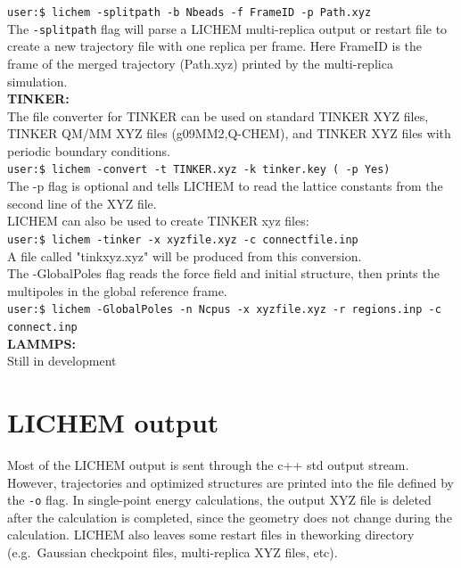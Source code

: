 \documentclass[12pt]{report}
\begin{document}
\texttt{user:\$ lichem -splitpath -b Nbeads -f FrameID -p Path.xyz} \\

The \texttt{-splitpath} flag will parse a LICHEM multi-replica output or
restart file to create a new trajectory file with one replica per frame.
Here FrameID is the frame of the merged trajectory (Path.xyz) printed by the
multi-replica simulation. \\

{\textbf{TINKER:}} \\

The file converter for TINKER can be used on standard TINKER XYZ files,
TINKER QM/MM XYZ files (g09MM2,Q-CHEM), and TINKER XYZ files with periodic
boundary conditions. \\

\texttt{user:\$ lichem -convert -t TINKER.xyz -k tinker.key ( -p Yes)} \\

The -p flag is optional and tells LICHEM to read the lattice constants from
the second line of the XYZ file. \\

LICHEM can also be used to create TINKER xyz files: \\

\texttt{user:\$ lichem -tinker -x xyzfile.xyz -c connectfile.inp} \\

A file called "tinkxyz.xyz" will be produced from this conversion. \\

The -GlobalPoles flag reads the force field and initial structure, then prints
the multipoles in the global reference frame. \\

\texttt{user:\$ lichem -GlobalPoles -n Ncpus
-x xyzfile.xyz -r regions.inp
 -c connect.inp} \\

{\textbf{LAMMPS:}} \\

{\color{red}Still in development}

\section{LICHEM output}

Most of the LICHEM output is sent through the c++ std output stream.
However, trajectories and optimized structures are printed into the file
defined by the \texttt{-o} flag.
In single-point energy calculations, the output XYZ file is deleted after the
calculation is completed, since the geometry does not change during the
calculation.
LICHEM also leaves some restart files in theworking directory (e.g.\ Gaussian
checkpoint files, multi-replica XYZ files, etc).
\end{document}
